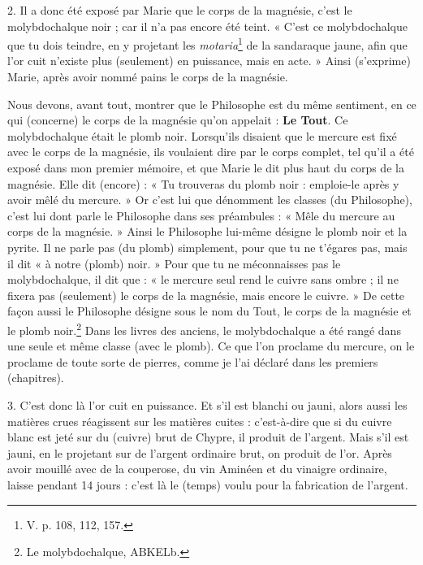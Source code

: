 \documentclass[a4paper, 11pt, oneside, polutonikogreek, french]{article}
\begin{document}
2. Il a donc été exposé par Marie que le corps de la magnésie, c'est le molybdochalque noir ; car il n'a pas encore été teint. « C'est ce molybdochalque que tu dois teindre, en y projetant les \emph{motaria}\footnote{V. p. 108, 112, 157.} de la sandaraque jaune, afin que l'or cuit n'existe plus (seulement) en puissance, mais en acte. » Ainsi (s'exprime) Marie, après avoir nommé pains le corps de la magnésie.

Nous devons, avant tout, montrer que le Philosophe est du même sentiment, en ce qui (concerne) le corps de la magnésie qu'on appelait : \textbf{Le Tout}. Ce molybdochalque était le plomb noir. Lorsqu'ils disaient que le mercure est fixé avec le corps de la magnésie, ils voulaient dire par le corps complet, tel qu'il a été exposé dans mon premier mémoire, et que Marie le dit plus haut du corps de la magnésie. Elle dit (encore) : « Tu trouveras du plomb noir : emploie-le après y avoir mêlé du mercure. » Or c'est lui que dénomment les classes (du Philosophe), c'est lui dont parle le Philosophe dans ses préambules : « Mêle du mercure au corps de la magnésie. » Ainsi le Philosophe lui-même désigne le plomb noir et la pyrite. Il ne parle pas (du plomb) simplement, pour que tu ne t'égares pas, mais il dit « à notre (plomb) noir. » Pour que tu ne méconnaisses pas le molybdochalque, il dit que : « le mercure seul rend le cuivre sans ombre ; il ne fixera pas (seulement) le corps de la magnésie, mais encore le cuivre. » De cette façon aussi le Philosophe désigne sous le nom du Tout, le corps de la magnésie et le plomb noir.\footnote{Le molybdochalque, ABKELb.} Dans les livres des anciens, le molybdochalque a été rangé dans une seule et même classe (avec le plomb). Ce que l'on proclame du mercure, on le proclame de toute sorte de pierres, comme je l'ai déclaré dans les premiers (chapitres).

3. C'est donc là l'or cuit en puissance. Et s'il est blanchi ou jauni, alors aussi les matières crues réagissent sur les matières cuites : c'est-à-dire que si du cuivre blanc est jeté sur du (cuivre) brut de Chypre, il produit de l'argent. Mais s'il est jauni, en le projetant sur de l'argent ordinaire brut, on produit de l'or. Après avoir mouillé avec de la couperose, du vin Aminéen et du vinaigre ordinaire, laisse pendant 14 jours : c'est là le (temps) voulu pour la fabrication de l'argent.
\end{document}
